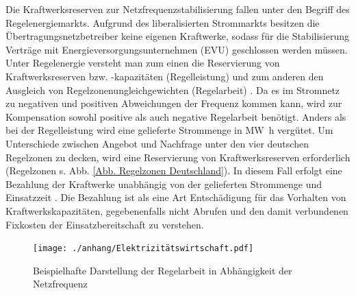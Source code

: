 		Die Kraftwerksreserven zur Netzfrequenzstabilisierung fallen unter den Begriff des Regelenergiemarkts.
		Aufgrund des liberalisierten Strommarkts besitzen die Übertragungsnetzbetreiber keine eigenen Kraftwerke, sodass für die Stabilisierung Verträge mit Energieversorgungsunternehmen (EVU) geschlossen werden müssen. \\
			
		Unter Regelenergie versteht man zum einen die Reservierung von Kraftwerksreserven bzw. -kapazitäten (Regelleistung) und zum anderen den Ausgleich von Regelzonenungleichgewichten (Regelarbeit) \parencite{Elektrizitätswirtschaft}.
		Da es im Stromnetz zu negativen und positiven Abweichungen der Frequenz kommen kann, wird zur Kompensation sowohl positive als auch negative Regelarbeit benötigt.
		Anders als bei der Regelleistung wird eine gelieferte Strommenge in \si{\mega\watt\hour} vergütet.
		Um Unterschiede zwischen Angebot und Nachfrage unter den vier deutschen Regelzonen zu decken, wird eine Reservierung von Kraftwerksreserven erforderlich (Regelzonen s. Abb. \ref{Abb. Regelzonen Deutschland}). 
		In diesem Fall erfolgt eine Bezahlung der Kraftwerke unabhängig von der gelieferten Strommenge und Einsatzzeit \parencite{Elektrizitätswirtschaft}. 
		Die Bezahlung ist als eine Art Entschädigung für das Vorhalten von Kraftwerkskapazitäten, gegebenenfalls nicht Abrufen und den damit verbundenen Fixkosten der Einsatzbereitschaft zu verstehen.   
		
		\begin{figure} [H]
			\centering
			\label{Abb. Beispielhafte Darstellung der Regelenergie in Abhängigkeit der Netzfrequenz}
			\texttt{[image: ./anhang/Elektrizitätswirtschaft.pdf]}
			\caption{Beispielhafte Darstellung der Regelarbeit in Abhängigkeit der Netzfrequenz \parencite{Elektrizitätswirtschaft}}
		\end{figure}
	
